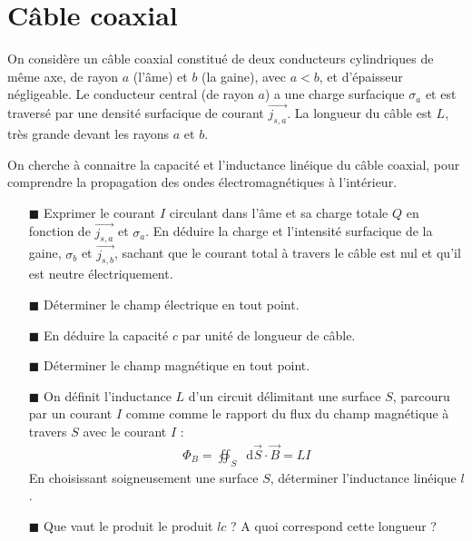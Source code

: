 \documentclass{report}
\newcommand*\dif{\mathop{}\!\mathrm{d}}
\begin{document}
\newpage

\section*{Câble coaxial}

On considère un câble coaxial constitué de deux conducteurs cylindriques de même axe, de rayon $a$ (l'âme) et $b$ (la gaine), avec $a<b$, et d'épaisseur négligeable. Le conducteur central (de rayon $a$) a une charge surfacique $\sigma_a$ et est traversé par une densité surfacique de courant $\vec{j_{s,a}}$. La longueur du câble est $L$, très grande devant les rayons $a$ et $b$.  

On cherche à connaitre la capacité et l'inductance linéique du câble coaxial, pour comprendre la propagation des ondes électromagnétiques à l'intérieur. 

\begin{itemize}

	\item[$\blacksquare$] Exprimer le courant $I$ circulant dans l'âme et sa charge totale $Q$ en fonction de $\vec{j_{s,a}}$ et $\sigma_a$. En déduire la charge et l'intensité surfacique de la gaine, $\sigma_b$ et $\vec{j_{s,b}}$, sachant que le courant total à travers le câble est nul et qu'il est neutre électriquement.
	
	\item[$\blacksquare$] Déterminer le champ électrique en tout point.

	\item[$\blacksquare$] En déduire la capacité $c$ par unité de longueur de câble. 
	
	\item[$\blacksquare$]	 Déterminer le champ magnétique en tout point. 
	
	\item[$\blacksquare$] On définit l'inductance $L$ d'un circuit délimitant une surface $S$, parcouru par un courant $I$ comme  comme le rapport du flux du champ magnétique à travers $S$ avec le courant $I$ :
	\begin{align*}
		\Phi_B=\oiint_S \dif \vec{S}\cdot\vec{B}=LI
	\end{align*}
En choisissant soigneusement une surface $S$, déterminer l'inductance linéique $l$. 

	\item[$\blacksquare$] Que vaut le produit le produit $lc$ ? A quoi correspond cette longueur ?
	
\end{itemize}
\end{document}
